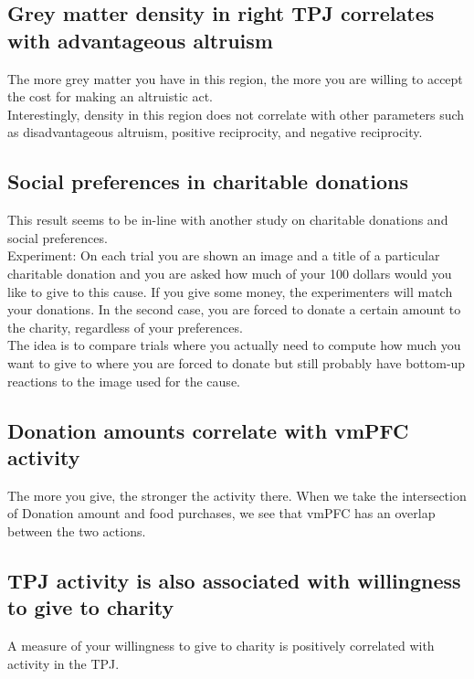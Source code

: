\subsection{Grey matter density in right TPJ correlates with advantageous altruism}
The more grey matter you have in this region, the more you are willing to accept the cost for making an altruistic act.
\\Interestingly, density in this region does not correlate with other parameters such as disadvantageous altruism, positive reciprocity, and negative reciprocity.

\subsection{Social preferences in charitable donations}
This result seems to be in-line with another study on charitable donations and social preferences.
\\Experiment: On each trial you are shown an image and a title of a particular charitable donation and you are asked how much of your 100 dollars would you like to give to this cause. If you give some money, the experimenters will match your donations. In the second case, you are forced to donate a certain amount to the charity, regardless of your preferences. 
\\The idea is to compare trials where you actually need to compute how much you want to give to where you are forced to donate but still probably have bottom-up reactions to the image used for the cause.
\subsection{Donation amounts correlate with vmPFC activity}
The more you give, the stronger the activity there. When we take the intersection of Donation amount and food purchases, we see that vmPFC has an overlap between the two actions.

\subsection{TPJ activity is also associated with willingness to give to charity}
A measure of your willingness to give to charity is positively correlated with activity in the TPJ.
